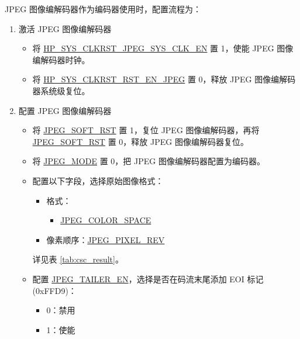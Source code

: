 \documentclass[main\_\_CN.tex]{subfiles}
\begin{document}
JPEG 图像编解码器作为编码器使用时，配置流程为：
\begin{enumerate}
    \item 激活 JPEG 图像编解码器
    \begin{itemize}
        \item 将 \hyperref[fielddesc:HPSYSCLKRSTJPEGSYSCLKEN]{HP\_SYS\_CLKRST\_JPEG\_SYS\_CLK\_EN} 置 1，使能 JPEG 图像编解码器时钟。
        \item 将 \hyperref[fielddesc:HPSYSCLKRSTRSTENJPEG]{HP\_SYS\_CLKRST\_RST\_EN\_JPEG} 置 0，释放 JPEG 图像编解码器系统级复位。
    \end{itemize}
    \item 配置 JPEG 图像编解码器
    \begin{itemize}
        \item 将 \hyperref[fielddesc:JPEGSOFTRST]{JPEG\_SOFT\_RST} 置 1，复位 JPEG 图像编解码器，再将 \hyperref[fielddesc:JPEGSOFTRST]{JPEG\_SOFT\_RST} 置 0，释放 JPEG 图像编解码器复位。
        \item 将 \hyperref[fielddesc:JPEGMODE]{JPEG\_MODE} 置 0，把 JPEG 图像编解码器配置为编码器。
        \item 配置以下字段，选择原始图像格式：
        \begin{itemize}
            \item 格式：
                \begin{itemize}
                    \item \hyperref[fielddesc:JPEGCOLORSPACE]{JPEG\_COLOR\_SPACE}
                \end{itemize}
            \item 像素顺序：\hyperref[fielddesc:JPEGPIXELREV]{JPEG\_PIXEL\_REV}
        \end{itemize}
        详见表 \ref{tab:csc_result}。
        \item 配置 \hyperref[fielddesc:JPEGTAILEREN]{JPEG\_TAILER\_EN}，选择是否在码流末尾添加 EOI 标记 (0xFFD9)：
        \begin{itemize}
            \item 0：禁用
            \item 1：使能
        \end{itemize}

\end{itemize}
\end{enumerate}
\end{document}
